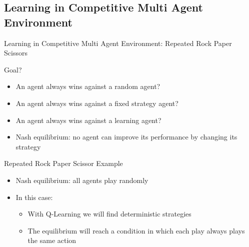 \documentclass[presentation, 8pt]{beamer}\mode<presentation>{\usetheme{AMSBolognaFC}}
\begin{document}
\subsection{Learning in Competitive Multi Agent Environment}
\begin{frame}{Learning in Competitive Multi Agent Environment: Repeated Rock Paper Scissors}
	\begin{alertblock}{Goal?}
		\begin{itemize}
			\item An agent always wins against a random agent?
			\item An agent always wins against a fixed strategy agent?
			\item An agent always wins against a learning agent?
			\item Nash equilibrium: no agent can improve its performance by changing its strategy
		\end{itemize}
	\end{alertblock}
	\begin{exampleblock}{Repeated Rock Paper Scissor Example}
		\begin{itemize}
			\item Nash equilibrium: all agents play randomly
			\item In this case: 
			\begin{itemize}
				\item With Q-Learning we will find deterministic strategies
				\item The equilibrium will reach a condition in which each play always plays the same action
			\end{itemize}
		\end{itemize}
	\end{exampleblock}
\end{frame}
\end{document}
